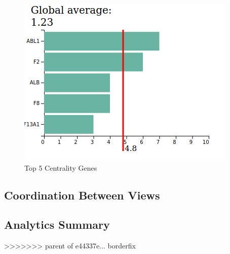 \documentclass[12pt,twocolumn,twoside]{article}
\begin{document}
\begin{figure}
	\includegraphics[width=.95\linewidth]{top5.png}
	\caption{Top 5 Centrality Genes}
	\label{top5}
\end{figure}

\subsection*{Coordination Between Views}


\subsection*{Analytics Summary}

\clearpage

 

>>>>>>> parent of e44337e... borderfix
\end{document}
